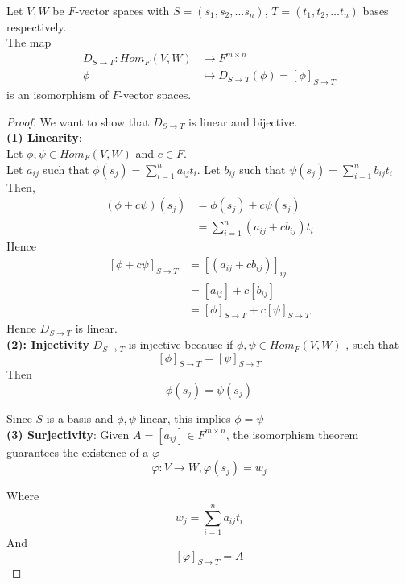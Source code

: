 \begin{theorem}
    Let $V, W$ be $F$-vector spaces with $S = (s_1, s_2, \hdots s_n)$, $T = (t_1, t_2, \hdots t_n)$ bases respectively. \\

    The map 
    \begin{align*}
        D_{S \to T} : Hom_F(V, W) &\to F^{m \times n} \\
        \phi & \mapsto D_{S \to T} (\phi) = \left[ \phi \right]_{S \to T}
    \end{align*}
    is an isomorphism of $F$-vector spaces.
\end{theorem}

\begin{proof} 
    We want to show that $D_{S \to T}$ is linear and bijective. \\

    \textbf{(1) Linearity}:  \\
    Let $\phi, \psi \in Hom_F(V, W)$  and $c \in F$. \\

    Let $a_{ij}$ such that $\phi(s_j) = \sum\limits_{i = 1}^{n} a_{ij} t_i$. Let $b_{ij}$ such that $\psi(s_j) = \sum\limits_{i = 1}^{n} b_{ij} t_i$ \\

    Then, 
    \begin{align*}
        \left( \phi + c \psi \right)  (s_j) &= \phi(s_j) + c \psi(s_j) \\
        &= \sum\limits_{i = 1}^{n}  (a_{ij} + cb_{ij}) t_i
    \end{align*}
    Hence 
    \begin{align*}
        \left[ \phi + c \psi \right]_{S \to T} &= \left[ \left( a_{ij }  + cb_{ij}\right)  \right]_{ij} \\
        &= \left[ a_{ij}  \right]  + c \left[ b_{ij}  \right] \\
        &= \left[ \phi \right]_{S \to T} + c \left[ \psi \right]_{S \to T}
    \end{align*}
    Hence $D_{S \to T}$ is linear. \\

    \textbf{(2): Injectivity}
    $D_{S \to T}$ is injective because if $ \phi, \psi \in Hom_F(V, W)$ , such that 
    \[
        \left[ \phi \right]_{S \to T} = \left[ \psi \right]_{S \to T}
    \]
    Then
    \[
        \phi(s_j) = \psi(s_j)
    \]

    Since $S$ is a basis and $\phi, \psi$ linear, this implies $\phi = \psi$ \\

    \textbf{(3) Surjectivity}: Given $A = \left[ a_{ij} \right] \in F^{m \times n}$, the isomorphism theorem guarantees the existence of a $\varphi$
    \[
        \varphi: V \to W, \varphi(s_j) = w_j
    \]

    Where
    \[
        w_j = \sum\limits_{i = 1}^{n} a_{ij}   t_i
    \]
    And 
    \[
        \left[ \varphi \right]_{S \to T} = A
    \]
\end{proof}

